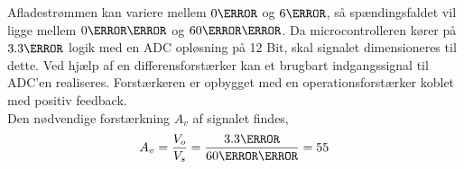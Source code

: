 Afladestrømmen kan variere mellem $0\ampere$ og $6\ampere$, så spændingsfaldet vil ligge mellem $0\milli\volt$ og $60\milli\volt$. Da microcontrolleren kører på $3.3\volt$ logik med en ADC opløsning på 12 Bit, skal signalet dimensioneres til dette. Ved hjælp af en differensforstærker kan et brugbart indgangssignal til ADC'en realiseres. Forstærkeren er opbygget med en operationsforstærker koblet med positiv feedback.
\\

Den nødvendige forstærkning $A_{v}$ af signalet findes,
\begin {equation} 
A_{v} = \frac{V_{o}}{V_{s}} = \frac{3.3\volt}{60\milli\volt} = 55
\end {equation}


